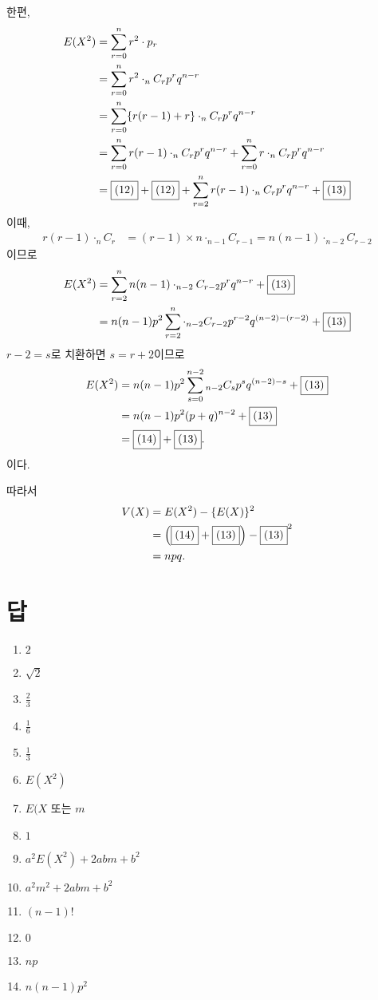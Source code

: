 \documentclass[a4paper]{oblivoir}
\newcounter{num}
\let\oldsection\section
\renewcommand\section{\clearpage\oldsection}
\begin{document}
한편,
\begin{align*}
E(X^2)
&=\sum_{r=0}^nr^2\cdot p_r\\
&=\sum_{r=0}^nr^2\cdot_nC_rp^rq^{n-r}\\
&=\sum_{r=0}^n\{r(r-1)+r\}\cdot_nC_rp^rq^{n-r}\\
&=\sum_{r=0}^nr(r-1)\cdot_nC_rp^rq^{n-r}+\sum_{r=0}^nr\cdot_nC_rp^rq^{n-r}\\
&=\fbox{(12)}+\fbox{(12)}+\sum_{r=2}^nr(r-1)\cdot_nC_rp^rq^{n-r}+\fbox{(13)}
\end{align*}
이때,
\begin{align*}
r(r-1)\cdot_nC_r
&=(r-1)\times n\cdot_{n-1}C_{r-1}=n(n-1)\cdot_{n-2}C_{r-2}
\end{align*}
이므로
\begin{align*}
E(X^2)
&=\sum_{r=2}^nn(n-1)\cdot_{n-2}C_{r-2}p^rq^{n-r}+\fbox{(13)}\\
&=n(n-1)p^2\sum_{r=2}^n\cdot_{n-2}C_{r-2}p^{r-2}q^{(n-2)-(r-2)}+\fbox{(13)}
\end{align*}
\(r-2=s\)로 치환하면 \(s=r+2\)이므로
\begin{align*}
E(X^2)
&=n(n-1)p^2\sum_{s=0}^{n-2}{}_{n-2}C_sp^sq^{(n-2)-s}+\fbox{(13)}\\
&=n(n-1)p^2(p+q)^{n-2}+\fbox{(13)}\\
&=\fbox{(14)}+\fbox{(13)}.
\end{align*}
이다.

따라서
\begin{align*}
V(X)
&=E(X^2)-\{E(X)\}^2\\
&=\left(\fbox{(14)}+\fbox{(13)}\right)-\fbox{(13)}^2\\
&=npq.
\end{align*}

%
\section*{답}
\begin{enumerate}[(1)]
\item
\(2\)
\item
\(\sqrt2\)
\item
\(\frac23\)
\item
\(\frac16\)
\item
\(\frac13\)
\item
\(E(X^2)\)
\item
\(E(X\) 또는 \(m\)
\item
\(1\)
\item
\(a^2E(X^2)+2abm+b^2\)
\item
\(a^2m^2+2abm+b^2\)
\item
\((n-1)!\)
\item
\(0\)
\item
\(np\)
\item
\(n(n-1)p^2\)
\end{enumerate}
\end{document}
